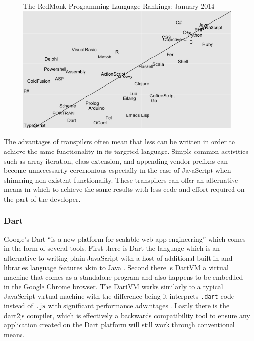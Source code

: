 \documentclass[final]{cmpreport}
\begin{document}

\begin{figure}[h]{The RedMonk Programming Language Rankings: January 2014 \label{ranking}}
  \includegraphics[width=1.0\textwidth]{lang-rank-114-wm.png}
\end{figure}

The advantages of transpilers often mean that less can be written in order to achieve the same functionality in its targeted language. Simple common activities such as array iteration, class extension, and appending vendor prefixes can become unnecessarily ceremonious especially in the case of JavaScript when shimming non-existent functionality. These transpilers can offer an alternative means in which to achieve the same results with less code and effort required on the part of the developer.
\subsubsection{Dart}
Google's Dart ``is a new platform for scalable web app engineering'' which comes in the form of several tools. First there is Dart the language which is an alternative to writing plain JavaScript with a host of additional built-in and libraries language features akin to Java \cite{Fortuna}. Second there is DartVM a virtual machine that comes as a standalone program and also happens to be embedded in the Google Chrome browser. The DartVM works similarly to a typical JavaScript virtual machine with the difference being it interprets \texttt{.dart} code instead of \texttt{.js} with significant performance advantages \cite{Schneider}. Lastly there is the dart2js compiler, which is effectively a backwards compatibility tool to ensure any application created on the Dart platform will still work through conventional means.
\end{document}
